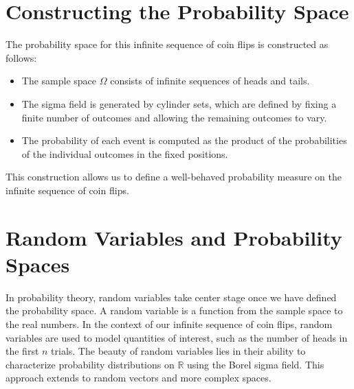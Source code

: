     \section{Constructing the Probability Space}
    The probability space for this infinite sequence of coin flips is constructed as follows:
    \begin{itemize}
        \item The sample space $\Omega$ consists of infinite sequences of heads and tails.
        \item The sigma field is generated by cylinder sets, which are defined by fixing a finite number of outcomes and allowing the remaining outcomes to vary.
        \item The probability of each event is computed as the product of the probabilities of the individual outcomes in the fixed positions.
    \end{itemize}
    This construction allows us to define a well-behaved probability measure on the infinite sequence of coin flips.
    
    \section{Random Variables and Probability Spaces}
    In probability theory, random variables take center stage once we have defined the probability space. A random variable is a function from the sample space to the real numbers. In the context of our infinite sequence of coin flips, random variables are used to model quantities of interest, such as the number of heads in the first $n$ trials. \newline
    The beauty of random variables lies in their ability to characterize probability distributions on $\mathbb{R}$ using the Borel sigma field. This approach extends to random vectors and more complex spaces.